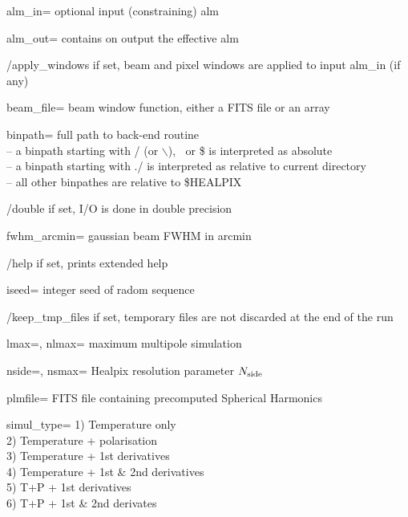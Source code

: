 \begin{keywords}
  \begin{kwlist}{} %
 \item[alm\_in=]    optional input (constraining) alm           

 \item[alm\_out=]   contains on output the effective alm

 \item[/apply\_windows] if set, beam and pixel windows are applied to input alm\_in
(if any)

 \item[beam\_file=] beam window function, either a FITS file or an array

 \item[binpath=] full path to back-end routine \\
              -- a binpath starting with / (or $\backslash$), $~$ or \$ is interpreted as absolute\\
              -- a binpath starting with ./ is interpreted as relative to current directory\\
              -- all other binpathes are relative to \$HEALPIX

 \item[/double]    if set, I/O is done in double precision 

 \item[fwhm\_arcmin=] gaussian beam FWHM in arcmin 

 \item[/help]      if set, prints extended help

 \item[iseed=] integer seed of radom sequence 

 \item[/keep\_tmp\_files] if set, temporary files are not discarded at the end of the
                   run

 \item[lmax=, nlmax=]   maximum multipole simulation 

 \item[nside=, nsmax=]  Healpix resolution parameter $N_{\rm side}$

 \item[plmfile=] FITS file containing precomputed Spherical Harmonics 

 \item[simul\_type=] 
        1) Temperature only \\
        2) Temperature + polarisation \\
        3) Temperature + 1st derivatives \\
        4) Temperature + 1st \& 2nd derivatives \\
        5) T+P + 1st derivatives \\
        6) T+P + 1st \& 2nd derivates


\end{kwlist}
\end{keywords}
